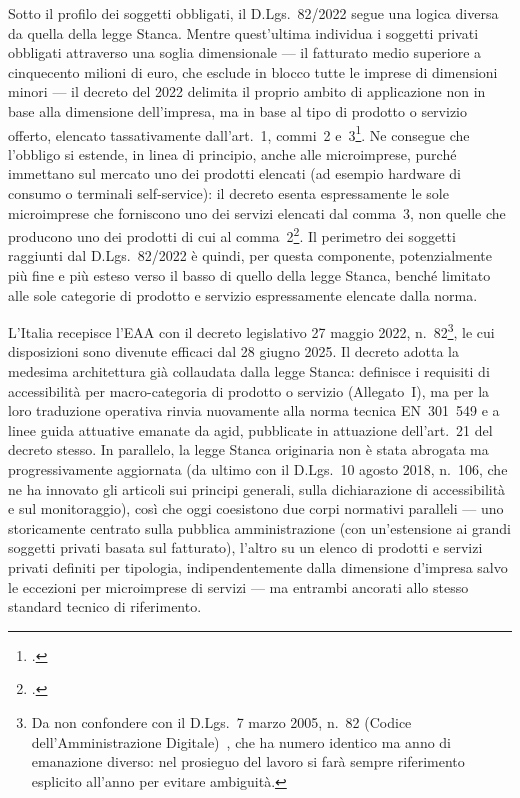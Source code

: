 Sotto il profilo dei soggetti obbligati, il D.Lgs.~82/2022 segue una logica diversa da quella della legge Stanca. Mentre quest'ultima individua i soggetti privati obbligati attraverso una soglia dimensionale --- il fatturato medio superiore a cinquecento milioni di euro, che esclude in blocco tutte le imprese di dimensioni minori --- il decreto del 2022 delimita il proprio ambito di applicazione non in base alla dimensione dell'impresa, ma in base al tipo di prodotto o servizio offerto, elencato tassativamente dall'art.~1, commi~2 e~3\footcite[art.~1, commi~2-3]{dlgs:82-2022}. Ne consegue che l'obbligo si estende, in linea di principio, anche alle microimprese, purché immettano sul mercato uno dei prodotti elencati (ad esempio hardware di consumo o terminali self-service): il decreto esenta espressamente le sole microimprese che forniscono uno dei servizi elencati dal comma~3, non quelle che producono uno dei prodotti di cui al comma~2\footcite[art.~3, comma~3: \enquote{Le microimprese che forniscono servizi sono esentate dall'osservanza dei requisiti di accessibilità di cui al comma 2}]{dlgs:82-2022}. Il perimetro dei soggetti raggiunti dal D.Lgs.~82/2022 è quindi, per questa componente, potenzialmente più fine e più esteso verso il basso di quello della legge Stanca, benché limitato alle sole categorie di prodotto e servizio espressamente elencate dalla norma.

L'Italia recepisce l'EAA con il decreto legislativo 27 maggio 2022, n.~82\footnote{Da non confondere con il D.Lgs.~7 marzo 2005, n.~82 (Codice dell'Amministrazione Digitale)~\autocite{dlgs:82-2005}, che ha numero identico ma anno di emanazione diverso: nel prosieguo del lavoro si farà sempre riferimento esplicito all'anno per evitare ambiguità.}, le cui disposizioni sono divenute efficaci dal 28 giugno 2025. Il decreto adotta la medesima architettura già collaudata dalla legge Stanca: definisce i requisiti di accessibilità per macro-categoria di prodotto o servizio (Allegato~I), ma per la loro traduzione operativa rinvia nuovamente alla norma tecnica EN~301~549 e a linee guida attuative emanate da \gls{agid}, pubblicate in attuazione dell'art.~21 del decreto stesso. In parallelo, la legge Stanca originaria non è stata abrogata ma progressivamente aggiornata (da ultimo con il D.Lgs.~10 agosto 2018, n.~106, che ne ha innovato gli articoli sui principi generali, sulla dichiarazione di accessibilità e sul monitoraggio), così che oggi coesistono due corpi normativi paralleli --- uno storicamente centrato sulla pubblica amministrazione (con un'estensione ai grandi soggetti privati basata sul fatturato), l'altro su un elenco di prodotti e servizi privati definiti per tipologia, indipendentemente dalla dimensione d'impresa salvo le eccezioni per microimprese di servizi --- ma entrambi ancorati allo stesso standard tecnico di riferimento.


